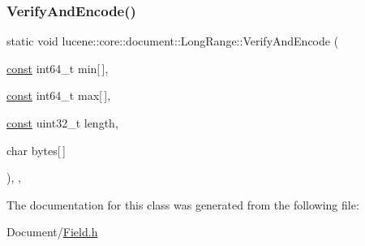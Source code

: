 \subsubsection{\texorpdfstring{Verify\+And\+Encode()}{VerifyAndEncode()}}
{\footnotesize\ttfamily static void lucene\+::core\+::document\+::\+Long\+Range\+::\+Verify\+And\+Encode (\begin{DoxyParamCaption}\item[{\mbox{\hyperlink{ZlibCrc32_8h_a2c212835823e3c54a8ab6d95c652660e}{const}} int64\+\_\+t}]{min\mbox{[}$\,$\mbox{]},  }\item[{\mbox{\hyperlink{ZlibCrc32_8h_a2c212835823e3c54a8ab6d95c652660e}{const}} int64\+\_\+t}]{max\mbox{[}$\,$\mbox{]},  }\item[{\mbox{\hyperlink{ZlibCrc32_8h_a2c212835823e3c54a8ab6d95c652660e}{const}} uint32\+\_\+t}]{length,  }\item[{char}]{bytes\mbox{[}$\,$\mbox{]} }\end{DoxyParamCaption})\hspace{0.3cm}{\ttfamily [inline]}, {\ttfamily [static]}, {\ttfamily [private]}}



The documentation for this class was generated from the following file\+:\begin{DoxyCompactItemize}
\item 
Document/\mbox{\hyperlink{Document_2Field_8h}{Field.\+h}}\end{DoxyCompactItemize}
